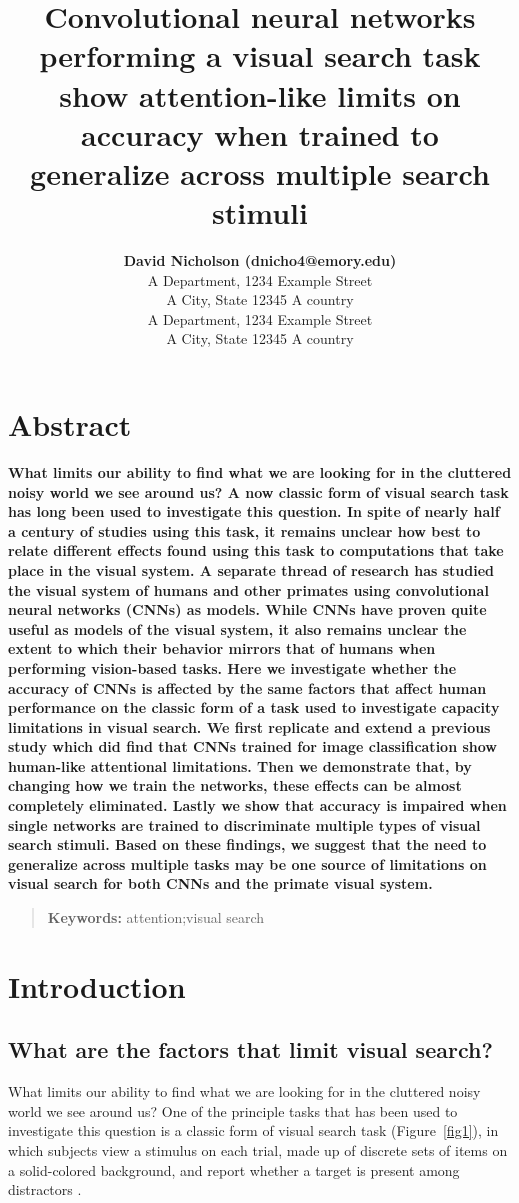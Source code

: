 \documentclass[10pt,letterpaper]{article}
\title{Convolutional neural networks performing a visual search task show attention-like 
limits on accuracy when trained to generalize across multiple search stimuli}
\author{{\large \bf David Nicholson (dnicho4@emory.edu)} \\
  A Department, 1234 Example Street\\
A City, State 12345 A country
  \AND {\large \bf Astrid Prinz (AnotherPerson@this.planet.edu)} \\
  A Department, 1234 Example Street\\
A City, State 12345 A country}
\begin{document}
\maketitle


\section{Abstract}
{
\bf
What limits our ability to find what we are looking for in the cluttered noisy world we 
see around us? A now classic form of visual search task has long been used to investigate 
this question. In spite of nearly half a century of studies 
using this task, it remains unclear how best to relate different effects found using this 
task to computations that take place in the visual system. A separate thread of research 
has studied the visual system of humans and other primates using convolutional neural 
networks (CNNs) as models. While CNNs have proven quite useful as models of the visual 
system, it also remains unclear the extent to which their behavior mirrors that of 
humans when performing vision-based tasks. Here we investigate whether the accuracy of 
CNNs is affected by the same factors that affect human performance on the classic form of 
a task used to investigate capacity limitations in visual search. We first replicate and extend
a previous study which did find that CNNs trained for image classification show human-like
attentional limitations. Then we demonstrate that, by changing how we train the networks, 
these effects can be almost completely eliminated. Lastly we show that accuracy is impaired when 
single networks are trained to discriminate multiple types of visual search stimuli. Based
on these findings, we suggest that the need to generalize across multiple tasks may be one 
source of limitations on visual search for both CNNs and the primate visual system.
}
\begin{quote}
\small
\textbf{Keywords:} 
attention;visual search
\end{quote}

\section{Introduction}
\subsection{What are the factors that limit visual search?}
What limits our ability to find what we are looking for in the cluttered noisy world we 
see around us? One of the principle tasks that has been used to investigate this question
is a classic form of visual search task (Figure~\ref{fig1}), in which subjects view a stimulus on each trial, 
made up of discrete sets of items on a solid-colored background, and report whether a 
target is present among distractors \cite{wolfeVisualSearch1998}. 
\end{document}
